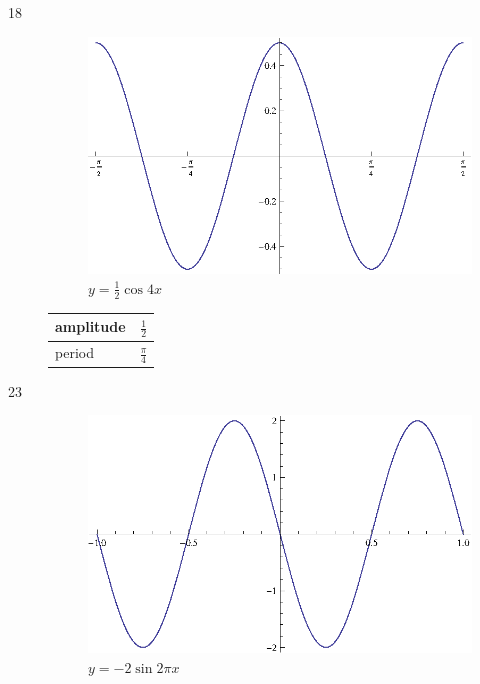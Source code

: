 \documentclass{exam}
\begin{document}
\begin{description}
      \item[18]
        \begin{figure}[H]
          \centering
          \includegraphics[scale=0.9]{exercise18.eps}
          \caption{$y = \frac{1}{2} \cos 4x$}
        \end{figure}

        \begin{tabular}[H]{lr}
          \toprule
          amplitude & $\frac{1}{2}$ \\
          \midrule
          period & $\frac{\pi}{4}$ \\
          \bottomrule
        \end{tabular}

      \item[23]
        \begin{figure}[H]
          \centering
          \includegraphics[scale=0.9]{exercise23.eps}
          \caption{$y = -2 \sin 2 \pi x$}
        \end{figure}


\end{description}
\end{document}
